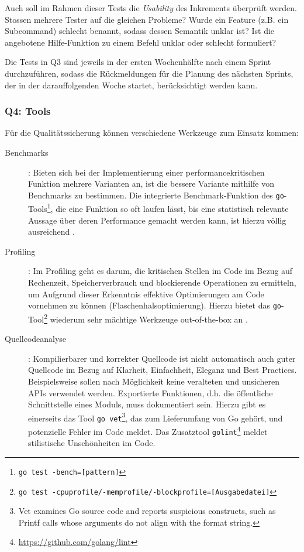 Auch soll im Rahmen dieser Tests die \textit{Usability} des Inkrements überprüft werden. Stossen mehrere Tester auf die gleichen Probleme? Wurde ein Feature (z.B. ein Subcommand) schlecht benannt, sodass dessen Semantik unklar ist? Ist die angebotene Hilfe-Funktion zu einem Befehl unklar oder schlecht formuliert?

Die Tests in Q3 sind jeweils in der ersten Wochenhälfte nach einem Sprint durchzuführen, sodass die Rückmeldungen für die Planung des nächsten Sprints, der in der darauffolgenden Woche startet, berücksichtigt werden kann.

\subsubsection{Q4: Tools}

Für die Qualitätssicherung können verschiedene Werkzeuge zum Einsatz kommen:

\begin{description}
	\item[Benchmarks]: Bieten sich bei der Implementierung einer performancekritischen Funktion mehrere Varianten an, ist die bessere Variante mithilfe von Benchmarks zu bestimmen. Die integrierte Benchmark-Funktion des \texttt{go}-Tools\footnote{\texttt{go test -bench=[pattern]}}, die eine Funktion so oft laufen lässt, bis eine statistisch relevante Aussage über deren Performance gemacht werden kann, ist hierzu völlig ausreichend \cite[p. 321]{gopl}.
	\item[Profiling]: Im Profiling geht es darum, die kritischen Stellen im Code im Bezug auf Rechenzeit, Speicherverbrauch und blockierende Operationen zu ermitteln, um Aufgrund dieser Erkenntnis effektive Optimierungen am Code vornehmen zu können (Flaschenhalsoptimierung). Hierzu bietet das \texttt{go}-Tool\footnote{\texttt{go test -cpuprofile/-memprofile/-blockprofile=[Ausgabedatei]}} wiederum sehr mächtige Werkzeuge out-of-the-box an \cite[p. 324]{gopl}.
	\item[Quellcodeanalyse]: Kompilierbarer und korrekter Quellcode ist nicht automatisch auch guter Quellcode im Bezug auf Klarheit, Einfachheit, Eleganz und Best Practices. Beispielsweise sollen nach Möglichkeit keine veralteten und unsicheren APIs verwendet werden. Exportierte Funktionen, d.h. die öffentliche Schnittstelle eines Moduls, muss dokumentiert sein. Hierzu gibt es einerseits das Tool \texttt{go vet}\footnote{Vet examines Go source code and reports suspicious constructs, such as
		Printf calls whose arguments do not align with the format string.}, das zum Lieferumfang von Go gehört, und potenzielle Fehler im Code meldet. Das Zusatztool \texttt{golint}\footnote{\url{https://github.com/golang/lint}} meldet stilistische Unschönheiten im Code.
\end{description}

